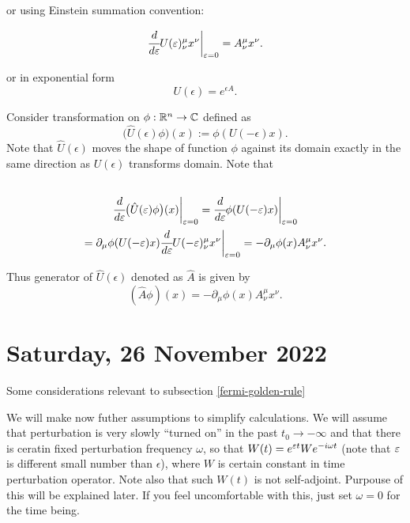 \documentclass[main.tex]{subfiles}
\begin{document}
or using Einstein summation convention:

\begin{equation}
\cfrac{d}{d\epsilon} U(\epsilon)^\mu_\nu x^\nu \bigg|_{\epsilon=0} = A^\mu_\nu x^\nu.
\end{equation}

or in exponential form 
\begin{equation}
U(\epsilon) = e^{\epsilon A}.
\end{equation}

Consider transformation on $\phi: \R^n\to\C$ defined as
\begin{equation}
\big(\hat{U}(\epsilon)\phi\big)(x) := \phi(U(-\epsilon)x).
\end{equation}
Note that $\hat{U}(\epsilon)$ moves the shape of function $\phi$ against its domain exactly in the same direction as $U(\epsilon)$ transforms domain.
Note that
\begin{multline}\\
\cfrac{d}{d\epsilon} \big(\hat{U}(\epsilon)\phi\big)(x) \bigg|_{\epsilon=0} =
 \cfrac{d}{d\epsilon} \phi(U(-\epsilon)x) \bigg|_{\epsilon=0}\\
 = \partial_\mu \phi(U(-\epsilon)x) \cfrac{d}{d\epsilon} U(-\epsilon)^\mu_\nu x^\nu \bigg|_{\epsilon=0}
 = - \partial_\mu \phi(x) A^\mu_\nu x^\nu.
 \\
\end{multline}

Thus generator of $\hat{U}(\epsilon)$ denoted as $\hat{A}$ is given by
\begin{equation}
(\hat{A}\phi)(x) = - \partial_\mu \phi(x) A^\mu_\nu x^\nu.
\end{equation}

\section{Saturday, 26 November 2022}

Some considerations relevant to subsection \ref{fermi-golden-rule}

We will make now futher assumptions to simplify calculations. We will assume that perturbation is very slowly ``turned on'' in the past $t_0 \to -\infty$ and that there is ceratin fixed perturbation frequency $\omega$, so that $W(t) = e^{\eepsilon t}W e^{-i\omega t}$ (note that $\eepsilon$ is different small number than $\epsilon$), where $W$ is certain constant in time perturbation operator. Note also that such $W(t)$ is not self-adjoint. Purpouse of this will be explained later. If you feel uncomfortable with this, just set $\omega = 0$ for the time being.   
\end{document}
